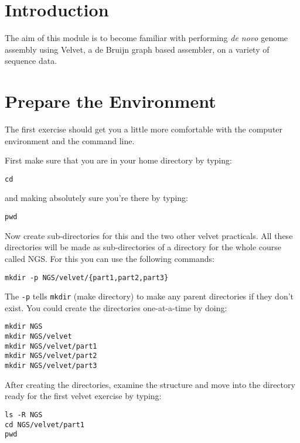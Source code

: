 \newpage

\section{Introduction}
The aim of this module is to become familiar with performing \textit{de novo}
genome assembly using Velvet, a de Bruijn graph based assembler, on a variety of
sequence data.

\section{Prepare the Environment}
\begin{information}
The first exercise should get you a little more comfortable with the computer
environment and the command line.
\end{information}

\begin{steps}
First make sure that you are in your home directory by typing:
\begin{lstlisting}
cd
\end{lstlisting}

and making absolutely sure you're there by typing:
\begin{lstlisting}
pwd
\end{lstlisting}

Now create sub-directories for this and the two other velvet practicals. All
these directories will be made as sub-directories of a directory for the whole
course called NGS. For this you can use the following commands:
\begin{lstlisting}
mkdir -p NGS/velvet/{part1,part2,part3}
\end{lstlisting}
\end{steps}

\begin{information}
The \texttt{-p} tells \texttt{mkdir} (make directory) to make any parent
directories if they don't exist. You could create the directories one-at-a-time
by doing:
\begin{lstlisting}
mkdir NGS
mkdir NGS/velvet
mkdir NGS/velvet/part1
mkdir NGS/velvet/part2
mkdir NGS/velvet/part3
\end{lstlisting}
\end{information}

\begin{steps}
After creating the directories, examine the structure and move into the
directory ready for the first velvet exercise by typing:
\begin{lstlisting}
ls -R NGS
cd NGS/velvet/part1
pwd
\end{lstlisting}

\end{steps}

